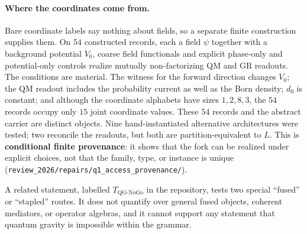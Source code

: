 \documentclass[11pt]{article}
\theoremstyle{definition}
\begin{document}
\paragraph{Where the coordinates come from.} Bare coordinate labels say nothing about fields, so a separate finite
construction supplies them. On \(54\) constructed records, each a field \(\psi\) together with a background potential
\(V_0\), coarse field functionals and explicit phase-only and potential-only controls realize mutually non-factorizing
QM and GR readouts. The conditions are material. The witness for the forward direction changes \(V_0\); the QM readout
includes the probability current as well as the Born density; \(d_0\) is constant; and although the coordinate alphabets
have sizes \(1,2,8,3\), the \(54\) records occupy only \(15\) joint coordinate values. These \(54\) records and the abstract carrier are
distinct objects. Nine hand-instantiated alternative architectures were tested; two reconcile the readouts, but both
are partition-equivalent to \(L\). This is \textbf{conditional finite provenance}: it shows that the fork can be
realized under explicit choices, not that the family, type, or instance is unique
(\nolinkurl{review_2026/repairs/q1_access_provenance/}).

A related statement, labelled \(T_{\mathrm{QG\text{-}NoGo}}\) in the repository, tests two special ``fused'' or
``stapled'' routes. It does not quantify over general fused objects, coherent mediators, or operator algebras, and it
cannot support any statement that quantum gravity is impossible within the grammar.
\end{document}
